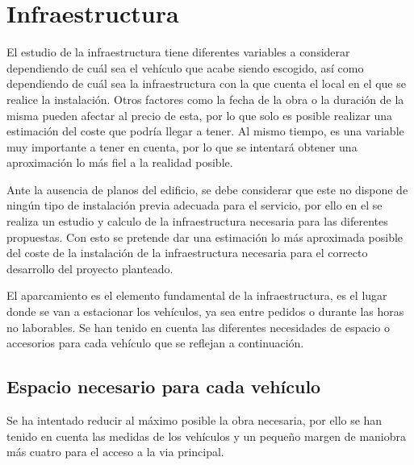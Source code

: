\newpage
\section{Infraestructura}
\label{anexinfraestr}

El estudio de la infraestructura tiene diferentes variables a considerar dependiendo de cuál sea el vehículo que acabe siendo escogido, así como dependiendo de cuál sea la infraestructura con la que cuenta el local en el que se realice la instalación. Otros factores como la fecha de la obra o la duración de la misma pueden afectar al precio de esta, por lo que solo es posible realizar una estimación del coste que podría llegar a tener. Al mismo tiempo, es una variable muy importante a tener en cuenta, por lo que se intentará obtener una aproximación lo más fiel a la realidad posible. 

Ante la ausencia de planos del edificio, se debe considerar que este no dispone de ningún tipo de instalación previa adecuada para el servicio, por ello en el  se realiza un estudio y calculo de la infraestructura necesaria para las diferentes propuestas. Con esto se pretende dar una estimación lo más aproximada posible del coste de la instalación de la infraestructura necesaria para el correcto desarrollo del proyecto planteado.

El aparcamiento es el elemento fundamental de la infraestructura, es el lugar donde se van a estacionar los vehículos, ya sea entre pedidos o durante las horas no laborables. Se han tenido en cuenta las diferentes necesidades de espacio o accesorios para cada vehículo que se reflejan a continuación. 

 
\subsection{Espacio necesario para cada vehículo}
Se ha intentado reducir al máximo posible la obra necesaria, por ello se han tenido en cuenta las medidas de los vehículos y un pequeño margen de maniobra más cuatro  para el acceso a la via principal.

